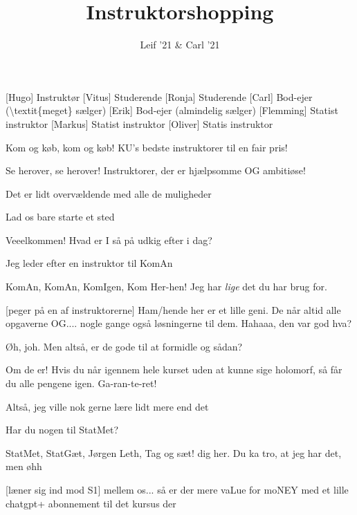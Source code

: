 \documentclass[a4paper,11pt]{article}
\title{Instruktorshopping}
\author{Leif '21 \& Carl '21}
\begin{document}
\maketitle

\begin{roles}
[Hugo] Instruktør
[Vitus] Studerende
[Ronja] Studerende
[Carl] Bod-ejer (\textbackslash{}textit\{meget\} sælger)
[Erik] Bod-ejer (almindelig sælger)
[Flemming] Statist instruktor
[Markus] Statist instruktor
[Oliver] Statis instruktor
\end{roles}

\begin{sketch}

 Kom og køb, kom og køb! KU's bedste instruktorer til en fair pris!

 Se herover, se herover! Instruktorer, der er hjælpsomme OG ambitiøse!

 Det er lidt overvældende med alle de muligheder

 Lad os bare starte et sted


 Veeelkommen! Hvad er I så på udkig efter i dag?

 Jeg leder efter en instruktor til KomAn

 KomAn, KomAn, KomIgen, Kom Her-hen! Jeg har \textit{lige} det du har brug for. 

[peger på en af instruktorerne] Ham/hende her er et lille geni. De når altid alle opgaverne OG.... nogle gange også løsningerne til dem. Hahaaa, den var god hva? 

 Øh, joh. Men altså, er de gode til at formidle og sådan?

 Om de er! Hvis du når igennem hele kurset uden at kunne sige holomorf, så får du alle pengene igen. Ga-ran-te-ret!

 Altså, jeg ville nok gerne lære lidt mere end det 

 Har du nogen til StatMet?

 StatMet, StatGæt, Jørgen Leth, Tag og sæt! dig her. Du ka tro, at jeg har det, men øhh

[læner sig ind mod S1] mellem os... så er der mere vaLue for moNEY med et lille chatgpt+ abonnement til det kursus der


\end{sketch}
\end{document}
